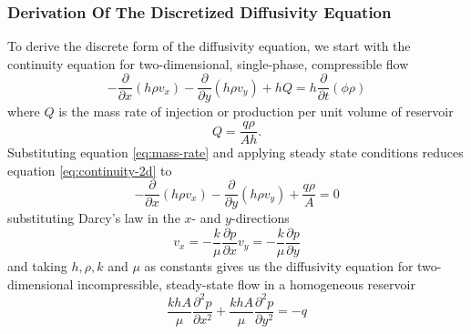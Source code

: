 \subsubsection{Derivation Of The Discretized Diffusivity Equation} %
\label{ssub:derivation}
To derive the discrete form of the diffusivity equation, we  start with the continuity equation for two-dimensional, single-phase, compressible flow \cite{Peaceman1977Fundamentals}
\begin{equation}
    \label{eq:continuity-2d}
    - \frac{\partial}{\partial x} \left( h\rho v_x \right) - \frac{\partial}{\partial y} \left( h\rho v_y \right) + hQ = h \frac{\partial }{\partial t} \left( \phi \rho \right)
\end{equation}
where $Q$ is the mass rate of injection or production per unit volume of reservoir
\begin{equation}
    \label{eq:mass-rate}
    Q = \frac{q\rho}{Ah}.
\end{equation}
Substituting equation \eqref{eq:mass-rate} and applying steady state conditions reduces equation \eqref{eq:continuity-2d} to
\begin{equation}
    - \frac{\partial}{\partial x} \left( h\rho v_x \right) - \frac{\partial}{\partial y} \left( h\rho v_y \right) + \frac{q\rho}{A} = 0
\end{equation}
substituting Darcy's law in the $x$- and $y$-directions \cite{Peaceman1977Fundamentals}
\begin{subequations}
    \begin{equation}
        v_x = -\frac{k}{\mu} \frac{\partial p}{\partial x}
    \end{equation}
    \begin{equation}
        v_y = -\frac{k}{\mu} \frac{\partial p}{\partial y}
    \end{equation}
\end{subequations}
and taking $h,\rho,k$ and $\mu$ as constants gives us the diffusivity equation for two-dimensional incompressible, steady-state flow in a homogeneous reservoir
\begin{equation}
    \label{eq:differential-flow}
    \frac{khA}{\mu} \frac{\partial^2 p}{\partial x^2}  + \frac{khA}{\mu} \frac{\partial^2 p}{\partial y^2} = -q
\end{equation}

